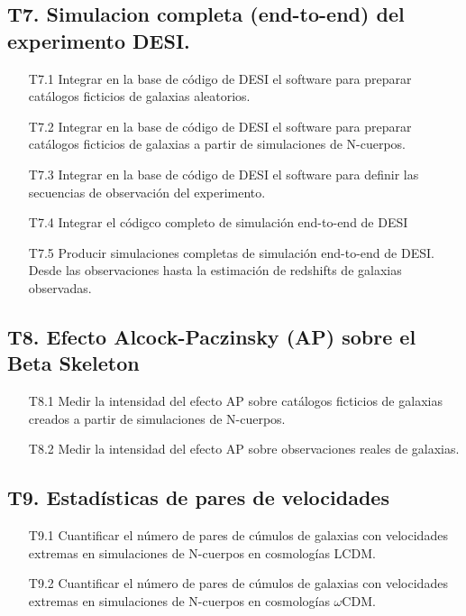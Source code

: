 \subsection*{T7. Simulacion completa (end-to-end) del experimento DESI.}
\begin{itemize}
\item[T7.1] Integrar en la base de c\'odigo de DESI el software para
  preparar cat\'alogos ficticios de galaxias aleatorios.
\item[T7.2] Integrar en la base de c\'odigo de DESI el software para
  preparar cat\'alogos ficticios de galaxias a partir de simulaciones
  de N-cuerpos.
\item[T7.3] Integrar en la base de c\'odigo de DESI el software para
  definir las secuencias de observaci\'on del experimento.
\item[T7.4] Integrar el c\'odigco completo de simulaci\'on end-to-end
  de DESI
\item[T7.5] Producir simulaciones completas de simulaci\'on end-to-end
  de DESI. Desde las observaciones hasta la estimaci\'on de redshifts
  de galaxias observadas.
\end{itemize}

\subsection*{T8. Efecto Alcock-Paczinsky (AP) sobre el Beta Skeleton}
\begin{itemize}
\item[T8.1] Medir la intensidad del efecto AP sobre cat\'alogos
  ficticios de galaxias creados a partir de simulaciones de N-cuerpos.
\item[T8.2] Medir la intensidad del efecto AP sobre observaciones
  reales de galaxias.
\end{itemize}

\subsection*{T9. Estad\'isticas de pares de velocidades}
\begin{itemize}
\item[T9.1] Cuantificar el n\'umero de pares de c\'umulos de galaxias
  con velocidades extremas en simulaciones de N-cuerpos en
  cosmolog\'ias LCDM.
\item[T9.2] Cuantificar el n\'umero de pares de c\'umulos de galaxias
  con velocidades extremas en simulaciones de N-cuerpos en
  cosmolog\'ias $\omega$CDM.
\end{itemize}

